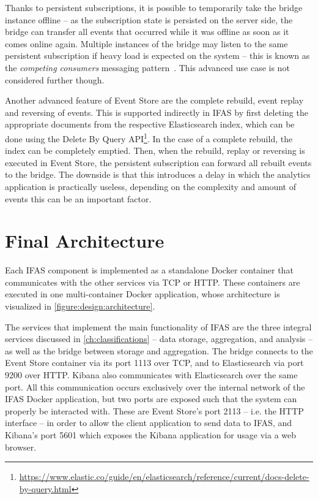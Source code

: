 Thanks to persistent subscriptions, it is possible to temporarily take the bridge instance offline -- as the subscription state is persisted on the server side, the bridge can transfer all events that occurred while it was offline as soon as it comes online again.
Multiple instances of the bridge may listen to the same persistent subscription if heavy load is expected on the system -- this is known as the \emph{competing consumers} messaging pattern~\cite{WEB:Microsoft-Competing-Consumers}.
This advanced use case is not considered further though.


Another advanced feature of Event Store are the complete rebuild, event replay and reversing of events.
This is supported indirectly in \ac{IFAS} by first deleting the appropriate documents from the respective Elasticsearch index, which can be done using the Delete By Query API\footnote{\url{https://www.elastic.co/guide/en/elasticsearch/reference/current/docs-delete-by-query.html}}.
In the case of a complete rebuild, the index can be completely emptied.
Then, when the rebuild, replay or reversing is executed in Event Store, the persistent subscription can forward all rebuilt events to the bridge.
The downside is that this introduces a delay in which the analytics application is practically useless, depending on the complexity and amount of events this can be an important factor.

\section{Final Architecture}
\label{section:design:architecture}

Each \ac{IFAS} component is implemented as a standalone Docker container that communicates with the other services via \ac{TCP} or \ac{HTTP}.
These containers are executed in one multi-container Docker application, whose architecture is visualized in \cref{figure:design:architecture}.

The services that implement the main functionality of \ac{IFAS} are the three integral services discussed in \cref{ch:classifications} -- data storage, aggregation, and analysis -- as well as the bridge between storage and aggregation.
The bridge connects to the Event Store container via its port 1113 over \ac{TCP}, and to Elasticsearch via port 9200 over \ac{HTTP}.
Kibana also communicates with Elasticsearch over the same port.
All this communication occurs exclusively over the internal network of the \ac{IFAS} Docker application, but two ports are exposed such that the system can properly be interacted with.
These are Event Store's port 2113 -- i.e. the \ac{HTTP} interface -- in order to allow the client application to send data to \ac{IFAS}, and Kibana's port 5601 which exposes the Kibana application for usage via a web browser.

